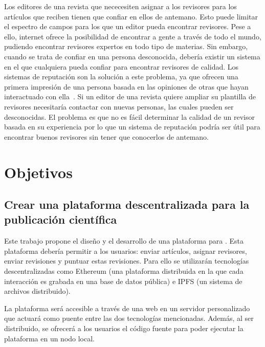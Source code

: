 Los editores de una revista que nececesiten asignar a los revisores para los
artículos que reciben tienen que confiar en ellos de antemano. Esto puede
limitar el espectro de campos para los que un editor pueda encontrar revisores.
Pese a ello, internet ofrece la posibilidad de encontrar a gente a través de
todo el mundo, pudiendo encontrar revisores expertos en todo tipo de materias.
Sin embargo, cuando se trata de confiar en una persona desconocida, debería
existir un sistema en el que cualquiera pueda confiar para encontrar revisores
de calidad. Los sistemas de reputación son la solución a este problema, ya
que ofrecen una primera impresión de una persona basada en las opiniones de
otras que hayan interactuado con ella~\cite{resnick2000reputation}. Si un editor
de una revista quiere ampliar su plantilla de revisores necesitaría contactar
con nuevas personas, las cuales pueden ser desconocidas. El problema es que no
es fácil determinar la calidad de un revisor basada en su experiencia
\cite{callaham_relationship_2007} por lo que un sistema de reputación podría ser
útil para encontrar buenos revisores sin tener que conocerlos de antemano.

\section{Objetivos}
\label{sec:objectives-1}
\subsection*{Crear una plataforma descentralizada para la publicación
  científica}

Este trabajo propone el diseño y el desarrollo de una plataforma para . Esta plataforma debería permitir a los usuarios: enviar artículos,
asignar revisores, enviar revisiones y puntuar estas revisiones. Para ello se
utilizarán tecnologías descentralizadas como Ethereum (una plataforma
distribuida en la que cada interacción es grabada en una base de datos pública)
e IPFS (un sistema de archivos distribuido).

La plataforma será accesible a través de una web en un servidor personalizado
que actuará como puente entre las dos tecnologías mencionadas. Además, al ser
distribuido, se ofrecerá a los usuarios el código fuente para poder ejecutar la
plataforma en un nodo local.

